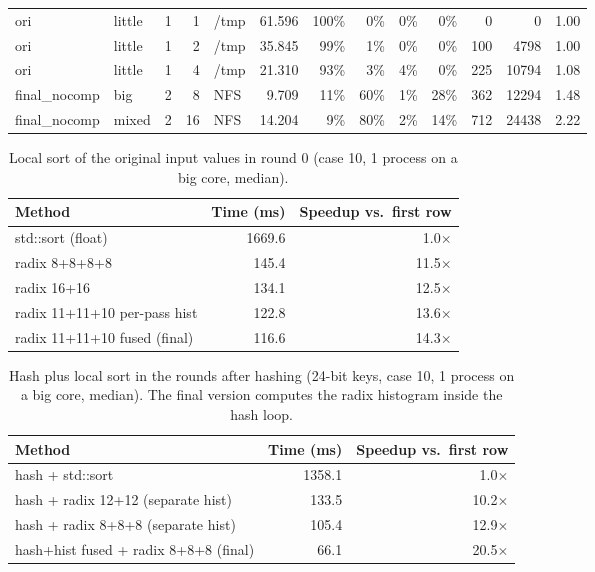 \begin{table}[htbp]
\begin{tabular}{llrrlrrrrrrrr}
ori & little & 1 & 1 & /tmp & 61.596 & 100\% & 0\% & 0\% & 0\% & 0 & 0 & 1.00 \\
ori & little & 1 & 2 & /tmp & 35.845 & 99\% & 1\% & 0\% & 0\% & 100 & 4798 & 1.00 \\
ori & little & 1 & 4 & /tmp & 21.310 & 93\% & 3\% & 4\% & 0\% & 225 & 10794 & 1.08 \\
final\_nocomp & big & 2 & 8 & NFS & 9.709 & 11\% & 60\% & 1\% & 28\% & 362 & 12294 & 1.48 \\
final\_nocomp & mixed & 2 & 16 & NFS & 14.204 & 9\% & 80\% & 2\% & 14\% & 712 & 24438 & 2.22 \\
\bottomrule
\end{tabular}
\end{table}

\begin{table}[htbp]
\centering
\caption{Local sort of the original input values in round 0 (case 10, 1 process on a big core, median).}
\label{tab:opt-radix}
\begin{tabular}{lrr}
\toprule
Method & Time (ms) & Speedup vs.\ first row \\
\midrule
std::sort (float) & 1669.6 & 1.0$\times$ \\
radix 8+8+8+8 & 145.4 & 11.5$\times$ \\
radix 16+16 & 134.1 & 12.5$\times$ \\
radix 11+11+10 per-pass hist & 122.8 & 13.6$\times$ \\
radix 11+11+10 fused (final) & 116.6 & 14.3$\times$ \\
\bottomrule
\end{tabular}
\end{table}

\begin{table}[htbp]
\centering
\caption{Hash plus local sort in the rounds after hashing (24-bit keys, case 10, 1 process on a big core, median). The final version computes the radix histogram inside the hash loop.}
\label{tab:opt-radix24}
\begin{tabular}{lrr}
\toprule
Method & Time (ms) & Speedup vs.\ first row \\
\midrule
hash + std::sort & 1358.1 & 1.0$\times$ \\
hash + radix 12+12 (separate hist) & 133.5 & 10.2$\times$ \\
hash + radix 8+8+8 (separate hist) & 105.4 & 12.9$\times$ \\
hash+hist fused + radix 8+8+8 (final) & 66.1 & 20.5$\times$ \\
\bottomrule
\end{tabular}
\end{table}

